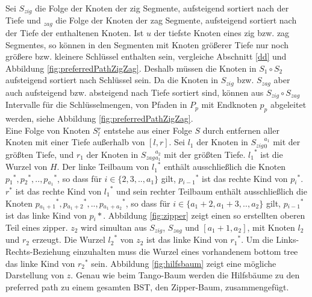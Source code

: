 \documentclass[a4paper,12pt]{article}
\begin{document}
  Sei $S_{zig}$ die Folge der Knoten der zig Segmente, aufsteigend sortiert nach der Tiefe und $_{zag}$ die Folge der Knoten der zag Segmente, aufsteigend sortiert nach der Tiefe der enthaltenen Knoten. Ist $u$ der tiefste Knoten eines zig bzw. zag Segmentes, so können in den Segmenten mit Knoten größerer Tiefe nur noch größere bzw. kleinere Schlüssel enthalten sein, vergleiche Abschnitt \ref{dd} und Abbildung \ref{fig:preferredPathZigZag}. Deshalb müssen die Knoten in $S_1 \circ S_2$ aufsteigend sortiert nach Schlüssel sein. Da die Knoten in $S_{zig}$ bzw. $S_{zag}$ aber auch aufsteigend bzw. absteigend nach Tiefe sortiert sind, können aus $S_{zig} \circ S_{zag}$ Intervalle für die Schlüsselmengen, von Pfaden in $P_p$ mit Endknoten $p_p$ abgeleitet werden, siehe Abbildung \ref{fig:preferredPathZigZag}.\\
  Eine Folge von Knoten $S{^r_l}$ entstehe aus einer Folge $S$ durch entfernen aller Knoten mit einer Tiefe außerhalb von $\left[l,r\right]$.  Sei $l_1$ der Knoten in $S{_{zig}}{^{a_1}_0}$ mit der größten Tiefe, und $r_1$ der Knoten in $S{_{zag}}{^{a_2}_{a_1}}$ mit der größten Tiefe. ${l_1}^*$  ist die Wurzel von $H$. Der linke Teilbaum von ${l_1}^*$ enthält ausschließlich die Knoten $p{_{1}}^*, p{_{2}}^*,..,p{_{a_1}}^*$, so dass für $i \in \{2, 3,.., a_1\}$ gilt, $p{_{i-1}}^*$ ist das rechte Kind von $p{_i}^*$. $r^*$ ist das rechte Kind von ${l_1}^*$ und sein rechter Teilbaum enthält ausschließlich die Knoten $p{_{a_1 + 1}}^*, p{_{a_1 + 2}}^*,..,p{_{a_1 + a_2}}^* $, so dass für $i \in \{a_1 + 2, a_1 + 3,.., a_2\}$ gilt, $p{_{i-1}}^*$ ist das linke Kind von $p{_i}*$. Abbildung \ref{fig:zipper} zeigt einen so erstellten oberen Teil eines zipper. $z_2$ wird simultan aus $S{_{zig}}$, $S{_{zag}}$ und $\left[a_1 + 1,a_2\right]$, mit Knoten $l_2$ und $r_2$   erzeugt. Die Wurzel ${l_2}^*$ von $z_2$ ist das linke Kind von ${r_1}^*$. Um die Links-Rechts-Beziehung einzuhalten muss die Wurzel eines vorhandenem bottom tree das linke Kind von ${r_2}^*$ sein. Abbildung \ref{fig:hilfsbaum} zeigt eine mögliche Darstellung von $z$. Genau wie beim Tango-Baum werden die Hilfsbäume zu den preferred path zu einem gesamten BST, den Zipper-Baum, zusammengefügt. \\ 
  
 
\end{document}
